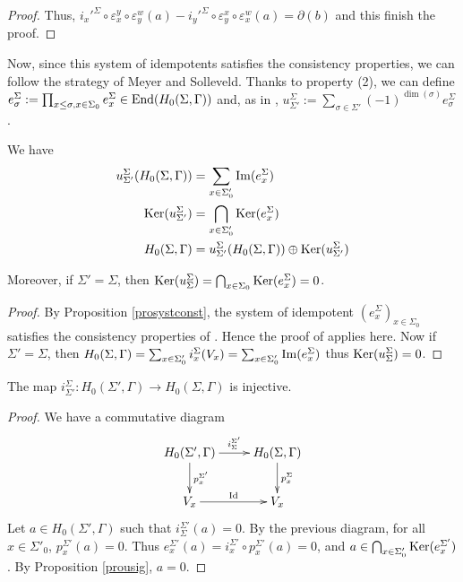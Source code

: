 \documentclass[a4paper,10pt]{amsart}
\begin{document}
\begin{proof}
	Thus, $i_x'^\Sigma \circ \varepsilon^y_x \circ  \varepsilon^w_y(a)-i_y'^\Sigma \circ \varepsilon^x_y \circ  \varepsilon^w_x(a) = \partial(b)$ and this finish the proof.
		
\end{proof}

Now, since this system of idempotents satisfies the consistency properties, we can follow the strategy of Meyer and Solleveld. Thanks to property (2), we can define $e_\sigma^\Sigma := \prod_{x \leq \sigma, x \in \Sigma_0} e_x^\Sigma \in \operatorname{End}(H_0(\Sigma,\Gamma))$ and, as in \cite[Thm. 2.12]{meyer_resolutions_2010}, $u_{\Sigma'}^{\Sigma}:=\sum_{\sigma \in \Sigma'} (-1)^{\dim(\sigma)} e_{\sigma}^{\Sigma}$.

\begin{Pro}
	\label{prousig}
	We have
	\begin{align*}
		u_{\Sigma'}^{\Sigma}(H_0(\Sigma,\Gamma))&=\sum_{x\in \Sigma'_0} \operatorname{Im}(e_x^{\Sigma})\\
		\operatorname{Ker}(u_{\Sigma'}^{\Sigma})&=\bigcap_{x\in \Sigma'_0} \operatorname{Ker}(e_x^{\Sigma})\\
		H_0(\Sigma,\Gamma)&=u_{\Sigma'}^{\Sigma}(H_0(\Sigma,\Gamma)) \oplus \operatorname{Ker}(u_{\Sigma'}^{\Sigma})
	\end{align*}

	Moreover, if $\Sigma'=\Sigma$, then $\operatorname{Ker}(u_{\Sigma}^{\Sigma})=\bigcap_{x\in \Sigma_0} \operatorname{Ker}(e_x^{\Sigma})=0$.
\end{Pro}

\begin{proof}
	By Proposition \ref{prosystconst}, the system of idempotent $(e_x^\Sigma)_{x \in \Sigma_0}$ satisfies the consistency properties of \cite{meyer_resolutions_2010}. Hence the proof of \cite[Thm. 2.12]{meyer_resolutions_2010} applies here. Now if $\Sigma'=\Sigma$, then $H_0(\Sigma,\Gamma)=\sum_{x\in \Sigma'_0} i_x^{\Sigma}(V_x) = \sum_{x\in \Sigma'_0} \operatorname{Im}(e_x^{\Sigma})$ thus $\operatorname{Ker}(u_{\Sigma}^{\Sigma})=0$.
\end{proof}

\begin{Pro}
	\label{proinjisigma}
	The map $i_{\Sigma'}^{\Sigma} : H_0(\Sigma',\Gamma) \to H_0(\Sigma,\Gamma)$ is injective.
\end{Pro}

\begin{proof}
	We have a commutative diagram 
	\[
	 \xymatrix{
    H_0(\Sigma',\Gamma) \ar[r]^-{i_\Sigma^{\Sigma'}} \ar[d]^-{p_x^{\Sigma'}} & H_0(\Sigma,\Gamma) \ar[d]^-{p_x^{\Sigma}} \\
     V_x \ar[r]^-{\Id} & V_x
  }
\]
Let $a \in H_0(\Sigma',\Gamma)$ such that $i_\Sigma^{\Sigma'}(a)=0$. By the previous diagram, for all $x \in \Sigma'_0$, $p_x^{\Sigma'}(a)=0$. Thus $e_x^{\Sigma'}(a)=i_x^{\Sigma'} \circ p_x^{\Sigma'}(a)=0$, and $a \in \bigcap_{x\in \Sigma'_0} \operatorname{Ker}(e_x^{\Sigma'})$. By Proposition \ref{prousig}, $a=0$.
\end{proof}
\end{document}
